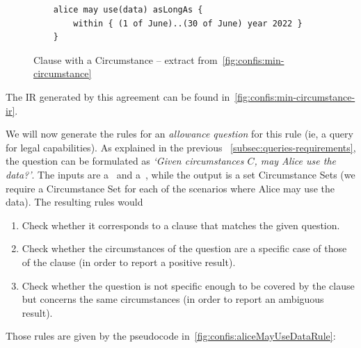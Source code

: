 \begin{figure}[h]
    \centering
    \begin{minipage}{0.7\textwidth}
        \begin{verbatim}
    alice may use(data) asLongAs {
        within { (1 of June)..(30 of June) year 2022 }
    }
        \end{verbatim}
    \end{minipage}
    \caption{Clause with a Circumstance -- extract from~\autoref{fig:confis:min-circumstance}}
    \label{fig:confis:aliceMayUseDataCClause}
\end{figure}

The IR generated by this agreement can be found in~\autoref{fig:confis:min-circumstance-ir}.

We will now generate the rules for an \emph{allowance question} for this rule (ie, a query for legal capabilities).
As explained in the previous ~\autoref{subsec:queries-requirements}, the question can be formulated as \emph{`Given circumstances $C$, may Alice use the data?'}.
The inputs are a~ and a~, while the output is a set Circumstance Sets (we require a Circumstance Set for each of the scenarios where Alice may use the data).
The resulting rules would
\begin{enumerate}
    \item Check whether it corresponds to a clause that matches the given question.
    \item Check whether the circumstances of the question are a specific case of those of the clause (in order to report a positive result).
    \item Check whether the question is not specific enough to be covered by the clause but concerns the same circumstances (in order to report an ambiguous result).
\end{enumerate}

Those rules are given by the pseudocode in~\autoref{fig:confis:aliceMayUseDataRule}:

